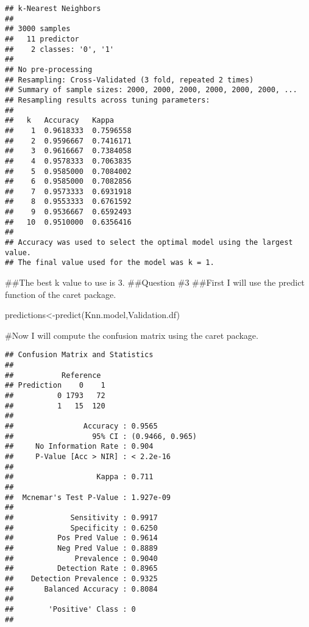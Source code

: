 \documentclass[
]{article}
\newenvironment{Shaded}{\begin{snugshade}}{\end{snugshade}}
\newcommand{\FunctionTok}[1]{\textcolor[rgb]{0.00,0.00,0.00}{#1}}
\newcommand{\NormalTok}[1]{#1}
\newcommand{\OtherTok}[1]{\textcolor[rgb]{0.56,0.35,0.01}{#1}}
\newcommand{\SpecialCharTok}[1]{\textcolor[rgb]{0.00,0.00,0.00}{#1}}
\begin{document}
\begin{verbatim}
## k-Nearest Neighbors 
## 
## 3000 samples
##   11 predictor
##    2 classes: '0', '1' 
## 
## No pre-processing
## Resampling: Cross-Validated (3 fold, repeated 2 times) 
## Summary of sample sizes: 2000, 2000, 2000, 2000, 2000, 2000, ... 
## Resampling results across tuning parameters:
## 
##   k   Accuracy   Kappa    
##    1  0.9618333  0.7596558
##    2  0.9596667  0.7416171
##    3  0.9616667  0.7384058
##    4  0.9578333  0.7063835
##    5  0.9585000  0.7084002
##    6  0.9585000  0.7082856
##    7  0.9573333  0.6931918
##    8  0.9553333  0.6761592
##    9  0.9536667  0.6592493
##   10  0.9510000  0.6356416
## 
## Accuracy was used to select the optimal model using the largest value.
## The final value used for the model was k = 1.
\end{verbatim}

\#\#The best k value to use is 3. \#\#Question \#3 \#\#First I will use
the predict function of the caret package.

\begin{Shaded}
\begin{Highlighting}[]
\NormalTok{predictions}\OtherTok{\textless{}{-}}\FunctionTok{predict}\NormalTok{(Knn.model,Validation.df)}
\end{Highlighting}
\end{Shaded}

\#Now I will compute the confusion matrix using the caret package.

\begin{Shaded}
\end{Shaded}

\begin{verbatim}
## Confusion Matrix and Statistics
## 
##           Reference
## Prediction    0    1
##          0 1793   72
##          1   15  120
##                                          
##                Accuracy : 0.9565         
##                  95% CI : (0.9466, 0.965)
##     No Information Rate : 0.904          
##     P-Value [Acc > NIR] : < 2.2e-16      
##                                          
##                   Kappa : 0.711          
##                                          
##  Mcnemar's Test P-Value : 1.927e-09      
##                                          
##             Sensitivity : 0.9917         
##             Specificity : 0.6250         
##          Pos Pred Value : 0.9614         
##          Neg Pred Value : 0.8889         
##              Prevalence : 0.9040         
##          Detection Rate : 0.8965         
##    Detection Prevalence : 0.9325         
##       Balanced Accuracy : 0.8084         
##                                          
##        'Positive' Class : 0              
## 
\end{verbatim}
\end{document}
